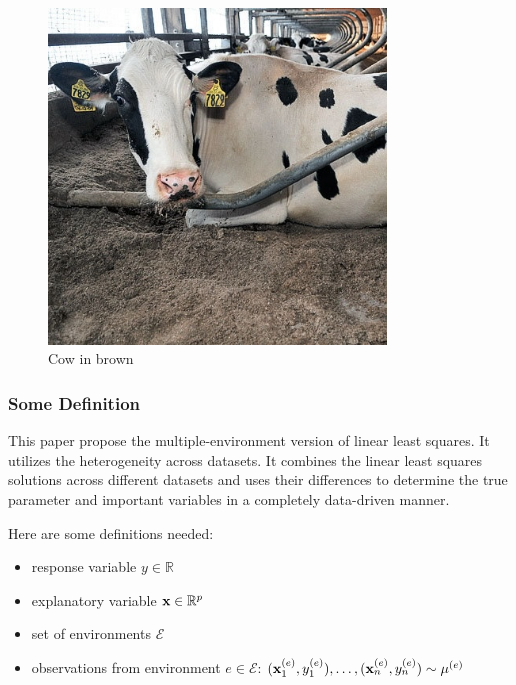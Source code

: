 \begin{frame}
\begin{minipage}{.3\textwidth}
\begin{figure}[H]
      \centering \includegraphics[width=0.8\textwidth]{figs/cow_sand.jpeg}
      \caption{Cow in brown}
    \end{figure}
  \end{minipage}
\end{frame}


\begin{frame}
  \frametitle{Some Definition}
  This paper propose the multiple-environment version of linear least squares. It utilizes the heterogeneity across datasets.
  It combines the linear least squares solutions across different datasets and uses their differences to determine the true parameter and important variables in a completely data-driven manner.
  
  \vspace{8pt}
  
  Here are some definitions needed: 
    \begin{itemize}
    \item response variable $y \in \mathbb R$
    \item explanatory variable $\mathbf x \in \mathbb R^p$
    \item set of environments $\mathcal E$
    \item observations from environment $e\in \mathcal E$:
      $(\mathbf x_1^{(e)}, y_1^{(e)}), \dots,  (\mathbf x_n^{(e)}, y_n^{(e)}) \sim \mu^{(e)}$
    \end{itemize}
    
\end{frame}

